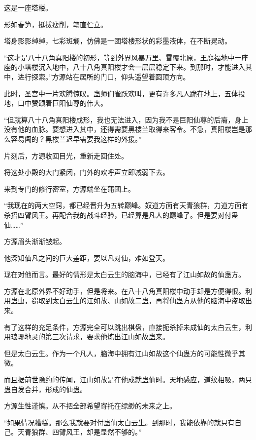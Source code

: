 
\begin{this_body}



这是一座塔楼。

形如春笋，挺拔瘦削，笔直伫立。

塔身影影绰绰，七彩斑斓，仿佛是一团塔楼形状的彩墨液体，在不断晃动。

“这才是八十八角真阳楼的初形，等到外界风暴万里、雪覆北原，王庭福地中一座座的小塔楼沉入地中，八十八角真阳楼才会一层层稳定下来。到那时，才能进入其中，进行探索。”方源站在居所的门口，仰头遥望着圆顶方向。

此时，圣宫中一片欢腾惊叹。蛊师们雀跃欢叫，更有许多凡人跪在地上，五体投地，口中赞颂着巨阳仙尊的伟大。

“但就算八十八角真阳楼成形，我也无法进入，因为我不是巨阳仙尊的后裔，身上没有他的血脉。要想进入其中，还得需要黑楼兰取得来客令。不急，真阳楼岂是那么容易闯的？黑楼兰迟早需要我这样的外援。”

片刻后，方源收回目光，重新走回住处。

将这处小殿的大门紧闭，门外的欢呼声立即减弱下去。

来到专门的修行密室，方源端坐在蒲团上。

“我现在的两大空窍，都已经晋升为五转巅峰。奴道方面有天青狼群，力道方面有杀招四臂风王。再配合我的战斗经验，已经算是凡人的巅峰了。但是要对付蛊仙……”

方源眉头渐渐皱起。

他深知仙凡之间的巨大差距，要以凡对仙，难如登天。

现在对他而言。最好的情形是太白云生的脑海中，已经有了江山如故的仙蛊方。

方源在北原外界不好动手，但是将来。在八十八角真阳楼中动手却是方便得很。利用蛊虫，窃取到太白云生的江如故、山如故二蛊，再将仙蛊方从他的脑海中盗取出来。

有了这样的充足条件，方源完全可以跳出棋盘，直接扼杀掉未成仙的太白云生，利用琅琊地灵的第三次请求，要求他炼出江山如故蛊来。

但是太白云生。作为一个凡人，脑海中拥有江山如故这个仙蛊方的可能性微乎其微。

而且据前世隐约的传闻，江山如故是在他成就蛊仙时。天地感应，道纹相吸，两只蛊自发合并，形成的仙蛊。

方源生性谨慎。从不把全部希望寄托在缥缈的未来之上。

“如果情况糟糕。那么我就要对付蛊仙太白云生。到那时，我能依靠的就只有自己。天青狼群、四臂风王，却是显然不够的。”


\end{this_body}

